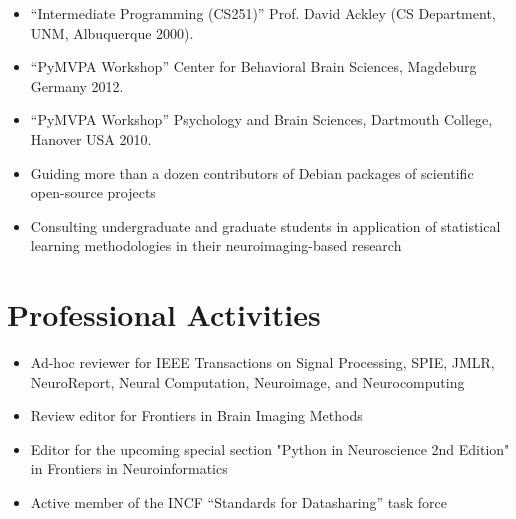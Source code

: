 \documentclass[12pt,overlapped,line]{res}
\newcommand{\mtitle}[1]{``#1''}
\newcommand{\mauthors}[1]{ \textit{#1.}}
\newcommand{\mwhere}[1]{#1.}
\begin{document}
\begin{resume}
\begin{description}[parsep=0.2em,leftmargin=1em]
\item[Teaching Assistant:]\hspace*{\fill}
  \begin{itemize}
  \item
    \mtitle{Intermediate Programming (CS251)}
    \mwhere{Prof. David Ackley (CS Department, UNM, Albuquerque 2000)}
  \end{itemize}
\item[Workshops Lecturer:]\hspace*{\fill}
  \begin{itemize}
  \item
    \mtitle{PyMVPA Workshop}
    \mwhere{Center for Behavioral Brain Sciences, Magdeburg Germany 2012}
  \item
    \mtitle{PyMVPA Workshop}
    \mwhere{Psychology and Brain Sciences, Dartmouth College, Hanover USA 2010}
  \end{itemize}
\item[Mentor:]  \hspace*{\fill}
  \begin{itemize}
  \item Guiding more than a dozen contributors of Debian packages
    of scientific open-source projects
  \item Consulting undergraduate and graduate students in
    application of statistical learning methodologies in their
    neuroimaging-based research
  \end{itemize}
\end{description}

\section{Professional Activities}
\begin{itemize}
\item Ad-hoc reviewer for IEEE Transactions on Signal Processing,
  SPIE, JMLR, NeuroReport, Neural Computation, Neuroimage, and Neurocomputing
\item Review editor for Frontiers in Brain Imaging Methods
\item Editor for the upcoming special section "Python in Neuroscience
  2nd Edition" in Frontiers in Neuroinformatics
\item Active member of the INCF ``Standards for Datasharing'' task force
\end{itemize}



\end{resume}
\end{document}
